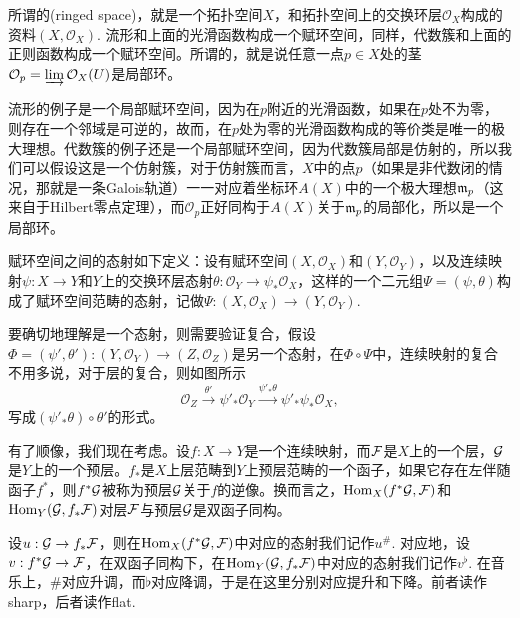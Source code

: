 \begin{para}[赋环空间]
所谓的(ringed space)，就是一个拓扑空间$X$，和拓扑空间上的交换环层$\mathcal{O}_X$构成的资料$(X,\mathcal{O}_X)$. 流形和上面的光滑函数构成一个赋环空间，同样，代数簇和上面的正则函数构成一个赋环空间。所谓的，就是说任意一点$p\in X$处的茎$\mathcal{O}_p=\varinjlim \mathcal{O}_X(U)$是局部环。
\end{para}

流形的例子是一个局部赋环空间，因为在$p$附近的光滑函数，如果在$p$处不为零，则存在一个邻域是可逆的，故而，在$p$处为零的光滑函数构成的等价类是唯一的极大理想。代数簇的例子还是一个局部赋环空间，因为代数簇局部是仿射的，所以我们可以假设这是一个仿射簇，对于仿射簇而言，$X$中的点$p$（如果是非代数闭的情况，那就是一条Galois轨道）一一对应着坐标环$A(X)$中的一个极大理想$\mathfrak{m}_p$（这来自于Hilbert零点定理），而$\mathcal{O}_p$正好同构于$A(X)$关于$\mathfrak{m}_p$的局部化，所以是一个局部环。

\begin{para}[赋环空间之间的态射]
赋环空间之间的态射如下定义：设有赋环空间$(X,\mathcal{O}_X)$和$(Y,\mathcal{O}_Y)$，以及连续映射$\psi:X\to Y$和$Y$上的交换环层态射$\theta:\mathcal{O}_Y\to \psi_*\mathcal{O}_X$，这样的一个二元组$\Psi=(\psi,\theta)$构成了赋环空间范畴的态射，记做$\Psi:(X,\mathcal{O}_X)\to (Y,\mathcal{O}_Y)$.
\end{para}

要确切地理解是一个态射，则需要验证复合，假设$\Phi=(\psi',\theta'):(Y,\mathcal{O}_Y)\to (Z,\mathcal{O}_Z)$是另一个态射，在$\Phi\circ \Psi$中，连续映射的复合不用多说，对于层的复合，则如图所示
\[
	\mathcal{O}_Z\xrightarrow{\theta'} \psi'_*\mathcal{O}_Y \xrightarrow{\psi'_*\theta} \psi'_*\psi_*\mathcal{O}_X,
\]
写成$(\psi'_*\theta)\circ \theta'$的形式。

\begin{para}[逆像]
有了顺像，我们现在考虑。设$f:X\to Y$是一个连续映射，而$\mathcal{F}$是$X$上的一个层，$\mathcal{G}$是$Y$上的一个预层。$f_*$是$X$上层范畴到$Y$上预层范畴的一个函子，如果它存在左伴随函子$f^*$，则$f^*\mathcal{G}$被称为预层$\mathcal{G}$关于$f$的逆像。换而言之，$\operatorname{Hom}_X(f^*\mathcal{G},\mathcal{F})$和$\operatorname{Hom}_Y(\mathcal{G},f_*\mathcal{F})$对层$\mathcal{F}$与预层$\mathcal{G}$是双函子同构。

设$u:\mathcal{G}\to f_*\mathcal{F}$，则在$\operatorname{Hom}_X(f^*\mathcal{G},\mathcal{F})$中对应的态射我们记作$u^\#$. 对应地，设$v:f^*\mathcal{G}\to \mathcal{F}$，在双函子同构下，在$\operatorname{Hom}_Y(\mathcal{G},f_*\mathcal{F})$中对应的态射我们记作$v^\flat$. 在音乐上，$\#$对应升调，而$\flat$对应降调，于是在这里分别对应提升和下降。前者读作sharp，后者读作flat. 
% 
\end{para}

